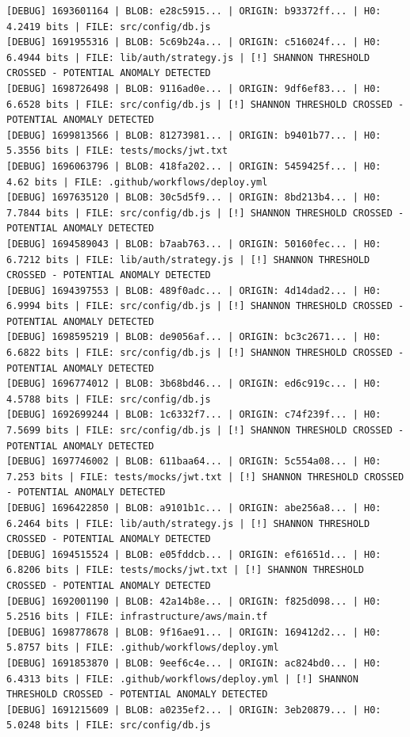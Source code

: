 \documentclass[12pt, a4paper, oneside]{report}
\begin{document}
\begin{lstlisting}[basicstyle=\tiny\ttfamily]
[DEBUG] 1693601164 | BLOB: e28c5915... | ORIGIN: b93372ff... | H0: 4.2419 bits | FILE: src/config/db.js
[DEBUG] 1691955316 | BLOB: 5c69b24a... | ORIGIN: c516024f... | H0: 6.4944 bits | FILE: lib/auth/strategy.js | [!] SHANNON THRESHOLD CROSSED - POTENTIAL ANOMALY DETECTED
[DEBUG] 1698726498 | BLOB: 9116ad0e... | ORIGIN: 9df6ef83... | H0: 6.6528 bits | FILE: src/config/db.js | [!] SHANNON THRESHOLD CROSSED - POTENTIAL ANOMALY DETECTED
[DEBUG] 1699813566 | BLOB: 81273981... | ORIGIN: b9401b77... | H0: 5.3556 bits | FILE: tests/mocks/jwt.txt
[DEBUG] 1696063796 | BLOB: 418fa202... | ORIGIN: 5459425f... | H0: 4.62 bits | FILE: .github/workflows/deploy.yml
[DEBUG] 1697635120 | BLOB: 30c5d5f9... | ORIGIN: 8bd213b4... | H0: 7.7844 bits | FILE: src/config/db.js | [!] SHANNON THRESHOLD CROSSED - POTENTIAL ANOMALY DETECTED
[DEBUG] 1694589043 | BLOB: b7aab763... | ORIGIN: 50160fec... | H0: 6.7212 bits | FILE: lib/auth/strategy.js | [!] SHANNON THRESHOLD CROSSED - POTENTIAL ANOMALY DETECTED
[DEBUG] 1694397553 | BLOB: 489f0adc... | ORIGIN: 4d14dad2... | H0: 6.9994 bits | FILE: src/config/db.js | [!] SHANNON THRESHOLD CROSSED - POTENTIAL ANOMALY DETECTED
[DEBUG] 1698595219 | BLOB: de9056af... | ORIGIN: bc3c2671... | H0: 6.6822 bits | FILE: src/config/db.js | [!] SHANNON THRESHOLD CROSSED - POTENTIAL ANOMALY DETECTED
[DEBUG] 1696774012 | BLOB: 3b68bd46... | ORIGIN: ed6c919c... | H0: 4.5788 bits | FILE: src/config/db.js
[DEBUG] 1692699244 | BLOB: 1c6332f7... | ORIGIN: c74f239f... | H0: 7.5699 bits | FILE: src/config/db.js | [!] SHANNON THRESHOLD CROSSED - POTENTIAL ANOMALY DETECTED
[DEBUG] 1697746002 | BLOB: 611baa64... | ORIGIN: 5c554a08... | H0: 7.253 bits | FILE: tests/mocks/jwt.txt | [!] SHANNON THRESHOLD CROSSED - POTENTIAL ANOMALY DETECTED
[DEBUG] 1696422850 | BLOB: a9101b1c... | ORIGIN: abe256a8... | H0: 6.2464 bits | FILE: lib/auth/strategy.js | [!] SHANNON THRESHOLD CROSSED - POTENTIAL ANOMALY DETECTED
[DEBUG] 1694515524 | BLOB: e05fddcb... | ORIGIN: ef61651d... | H0: 6.8206 bits | FILE: tests/mocks/jwt.txt | [!] SHANNON THRESHOLD CROSSED - POTENTIAL ANOMALY DETECTED
[DEBUG] 1692001190 | BLOB: 42a14b8e... | ORIGIN: f825d098... | H0: 5.2516 bits | FILE: infrastructure/aws/main.tf
[DEBUG] 1698778678 | BLOB: 9f16ae91... | ORIGIN: 169412d2... | H0: 5.8757 bits | FILE: .github/workflows/deploy.yml
[DEBUG] 1691853870 | BLOB: 9eef6c4e... | ORIGIN: ac824bd0... | H0: 6.4313 bits | FILE: .github/workflows/deploy.yml | [!] SHANNON THRESHOLD CROSSED - POTENTIAL ANOMALY DETECTED
[DEBUG] 1691215609 | BLOB: a0235ef2... | ORIGIN: 3eb20879... | H0: 5.0248 bits | FILE: src/config/db.js

\end{lstlisting}
\end{document}
